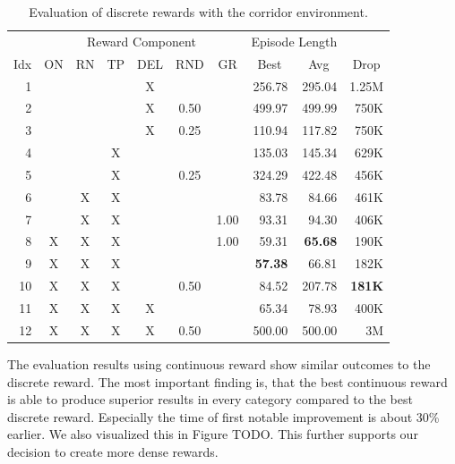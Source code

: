 \begin{table}[htp]
    \begin{center}
        \begin{tabular}{rccccccrrr}
            \toprule
             & \multicolumn{6}{c}{Reward Component} & \multicolumn{2}{c}{Episode Length} & \\
            \cmidrule(lr){2-7}\cmidrule(lr){8-9}
            \multicolumn{1}{c}{Idx} & \multicolumn{1}{c}{ON} & \multicolumn{1}{c}{RN} & \multicolumn{1}{c}{TP} & \multicolumn{1}{c}{DEL} & \multicolumn{1}{c}{RND} & \multicolumn{1}{c}{GR} & \multicolumn{1}{c}{Best} & \multicolumn{1}{c}{Avg} & \multicolumn{1}{c}{Drop}\\
            \midrule
            1 &  &  &  & X &  &  & 256.78 & 295.04 & 1.25M \\
            2 &  &  &  & X & 0.50 &  & 499.97 & 499.99 & 750K \\
            3 &  &  &  & X & 0.25 &  & 110.94 & 117.82 & 750K \\
            4 &  &  & X &  &  &  & 135.03 & 145.34 & 629K \\
            5 &  &  & X &  & 0.25 &  & 324.29 & 422.48 & 456K \\
            6 &  & X & X &  &  &  & 83.78 & 84.66 & 461K \\
            7 &  & X & X &  &  & 1.00 & 93.31 & 94.30 & 406K \\
            8 & X & X & X &  &  & 1.00 & 59.31 & \textbf{65.68} & 190K \\
            9 & X & X & X &  &  &  & \textbf{57.38} & 66.81 & 182K \\
            10 & X & X & X &  & 0.50 &  & 84.52 & 207.78 & \textbf{181K} \\
            11 & X & X & X & X &  &  & 65.34 & 78.93 & 400K \\
            12 & X & X & X & X & 0.50 &  & 500.00 & 500.00 & 3M \\
            \bottomrule
        \end{tabular}
    \end{center}
    \caption[Evaluation of Discrete Reward Evaluation with the Corridor Environment]{Evaluation of discrete rewards with the corridor environment.} \label{tab:Maze0318/Reward/Discrete}
\end{table}


The evaluation results using continuous reward show similar outcomes to the discrete reward. The most important finding is, that the best continuous reward is able to produce superior results in every category compared to the best discrete reward. Especially the time of first notable improvement is about 30\% earlier. We also visualized this in Figure TODO. This further supports our decision to create more dense rewards. 

